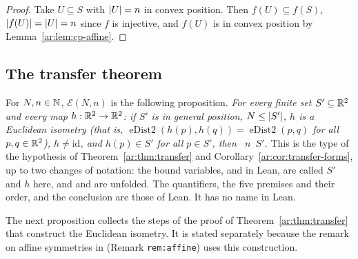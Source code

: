 \begin{proof}
Take $U\subseteq S$ with $\lvert U\rvert=n$ in convex position. Then $f(U)\subseteq f(S)$, $\lvert f(U)\rvert=\lvert U\rvert=n$ since $f$ is
injective, and $f(U)$ is in convex position by Lemma~\ref{ar:lem:cp-affine}.
\end{proof}

\subsection{The transfer theorem}

\begin{definition}\label{ar:def:E}
For $N,n\in\mathbb N$, $\mathcal E(N,n)$ is the following proposition. \emph{For every finite set $S'\subseteq\mathbb R^2$ and every
map $h:\mathbb R^2\to\mathbb R^2$: if $S'$ is in general position, $N\le\lvert S'\rvert$, $h$ is a Euclidean isometry \textup(that is,
$\operatorname{eDist2}(h(p),h(q))=\operatorname{eDist2}(p,q)$ for all $p,q\in\mathbb R^2$\textup), $h\ne\mathrm{id}$, and
$h(p)\in S'$ for all $p\in S'$, then ~$n$~$S'$.} This is the type of the hypothesis  of
Theorem~\ref{ar:thm:transfer} and Corollary~\ref{ar:cor:transfer-forms}, up to two changes of notation: the bound
variables,  and  in Lean, are called $S'$ and $h$ here, and  and  are
unfolded. The quantifiers, the five premises and their order, and the conclusion are those of Lean. It has no name in
Lean.
\end{definition}

The next proposition collects the steps of the proof of Theorem~\ref{ar:thm:transfer} that construct the Euclidean
isometry. It is stated separately because the remark on affine symmetries in  (Remark
\texttt{rem:affine}) uses this construction.

